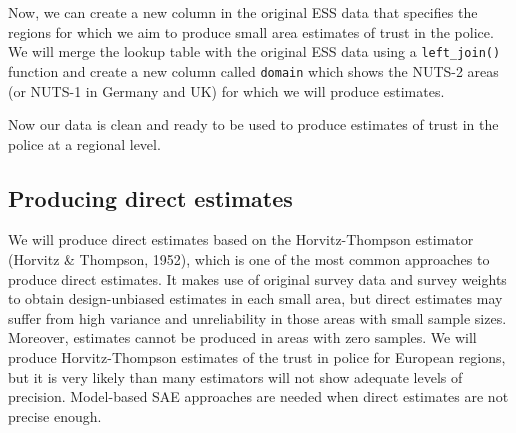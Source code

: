\documentclass[
]{article}
\newenvironment{Shaded}{\begin{snugshade}}{\end{snugshade}}
\newcommand{\CommentTok}[1]{\textcolor[rgb]{0.56,0.35,0.01}{\textit{#1}}}
\newcommand{\DataTypeTok}[1]{\textcolor[rgb]{0.13,0.29,0.53}{#1}}
\newcommand{\DecValTok}[1]{\textcolor[rgb]{0.00,0.00,0.81}{#1}}
\newcommand{\KeywordTok}[1]{\textcolor[rgb]{0.13,0.29,0.53}{\textbf{#1}}}
\newcommand{\NormalTok}[1]{#1}
\newcommand{\OperatorTok}[1]{\textcolor[rgb]{0.81,0.36,0.00}{\textbf{#1}}}
\newcommand{\StringTok}[1]{\textcolor[rgb]{0.31,0.60,0.02}{#1}}
\begin{document}
Now, we can create a new column in the original ESS data that specifies
the regions for which we aim to produce small area estimates of trust in
the police. We will merge the lookup table with the original ESS data
using a \texttt{left\_join()} function and create a new column called
\texttt{domain} which shows the NUTS-2 areas (or NUTS-1 in Germany and
UK) for which we will produce estimates.

\begin{Shaded}
\end{Shaded}

Now our data is clean and ready to be used to produce estimates of trust
in the police at a regional level.

\hypertarget{producing-direct-estimates}{%
\subsection{Producing direct
estimates}\label{producing-direct-estimates}}

We will produce direct estimates based on the Horvitz-Thompson estimator
(Horvitz \& Thompson, 1952), which is one of the most common approaches
to produce direct estimates. It makes use of original survey data and
survey weights to obtain design-unbiased estimates in each small area,
but direct estimates may suffer from high variance and unreliability in
those areas with small sample sizes. Moreover, estimates cannot be
produced in areas with zero samples. We will produce Horvitz-Thompson
estimates of the trust in police for European regions, but it is very
likely than many estimators will not show adequate levels of precision.
Model-based SAE approaches are needed when direct estimates are not
precise enough.
\end{document}
